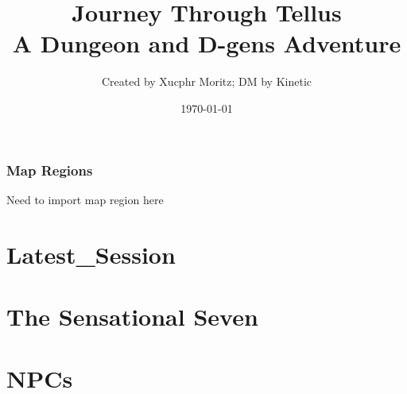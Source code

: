 \documentclass[letterpaper,twocolumn,openany,nodeprecatedcode]{dndbook}
\title{Journey Through Tellus \\
\large A Dungeon and D-gens Adventure}
\author{Created by Xucphr Moritz; DM by Kinetic}
\date{\today}
\begin{document}
\frontmatter

\maketitle

\tableofcontents

\mainmatter%



\section{Map Regions}

Need to import map region here






\part*{Latest_Session}


%

\part{The Sensational Seven}





\part{NPCs}



%
\end{document}
